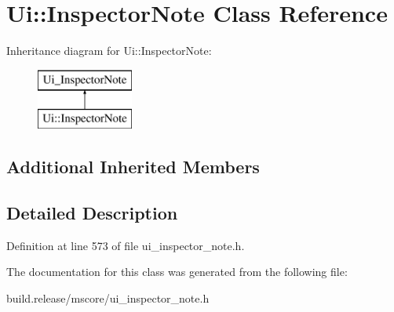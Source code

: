 \hypertarget{class_ui_1_1_inspector_note}{}\section{Ui\+:\+:Inspector\+Note Class Reference}
\label{class_ui_1_1_inspector_note}
Inheritance diagram for Ui\+:\+:Inspector\+Note\+:\begin{figure}[H]
\begin{center}
\leavevmode
\includegraphics[height=2.000000cm]{class_ui_1_1_inspector_note}
\end{center}
\end{figure}
\subsection*{Additional Inherited Members}


\subsection{Detailed Description}


Definition at line 573 of file ui\+\_\+inspector\+\_\+note.\+h.



The documentation for this class was generated from the following file\+:\begin{DoxyCompactItemize}
\item 
build.\+release/mscore/ui\+\_\+inspector\+\_\+note.\+h\end{DoxyCompactItemize}
